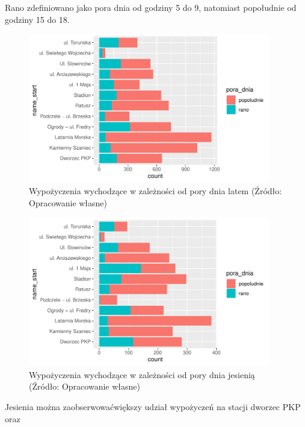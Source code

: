 \documentclass{amuthesis}
\begin{document}
Rano zdefiniowano jako pora dnia od godziny 5 do 9, natomiast popołudnie od godziny 15 do 18.

\begin{figure}[t]

{\centering \includegraphics[width=400px]{figures/analiza7-1} 

}

\caption{Wypożyczenia wychodzące w zależności od pory dnia latem (Źródło: Opracowanie własne) }\label{fig:analiza7}
\end{figure}
\begin{figure}[t]

{\centering \includegraphics[width=400px]{figures/analiza8-1} 

}

\caption{Wypożyczenia wychodzące w zależności od pory dnia jesienią (Źródło: Opracowanie własne)}\label{fig:analiza8}
\end{figure}

Jesienia można zaobserwowaćwiększy udział wypożyczeń na stacji dworzec PKP oraz
\end{document}
